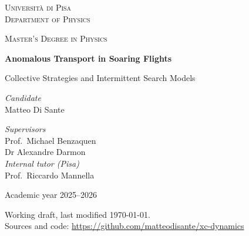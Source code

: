 





\hypersetup{pageanchor=false}

\begin{titlepage}
\centering
{\scshape\large Università di Pisa \\ Department of Physics\par}
{\scshape Master's Degree in Physics\par}
\vfill
{\Huge\bfseries Anomalous Transport in Soaring Flights\par}
\vspace{0.8em}
{\LARGE Collective Strategies and Intermittent Search Models\par}
\vfill
\begin{minipage}[t]{0.45\textwidth}
  \raggedright\large
  \textit{Candidate}\\
  Matteo Di Sante\par
\end{minipage}\hfill
\begin{minipage}[t]{0.45\textwidth}
  \raggedleft\large
  \textit{Supervisors}\\
  Prof.\ Michael Benzaquen\\
  Dr Alexandre Darmon\\[0.6em]
  \textit{Internal tutor (Pisa)}\\
  Prof.\ Riccardo Mannella\par
\end{minipage}
\vfill
{\large Academic year 2025--2026\par}
\vspace{1em}
{\small Working draft, last modified \today.\\
Sources and code: \url{https://github.com/matteodisante/xc-dynamics}\par}
\end{titlepage}

\hypersetup{pageanchor=true}

\begingroup
\small
\tableofcontents
\endgroup

\clearpage
{}

\begingroup
\raggedbottom
\setlength{\parskip}{4pt plus 1pt minus 1pt}



\endgroup





